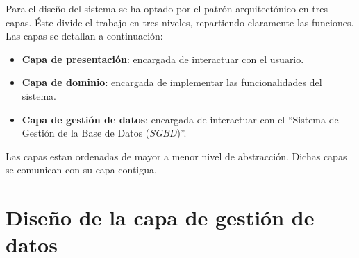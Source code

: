 

Para el diseño del sistema se ha optado por el patrón arquitectónico en tres capas. Éste divide el trabajo en tres niveles, repartiendo claramente las funciones.\\
Las capas se detallan a continuación:
\begin{itemize}
\item \textbf{Capa de presentación}: encargada de interactuar con el usuario.
\item \textbf{Capa de dominio}: encargada de implementar las funcionalidades del sistema.
\item \textbf{Capa de gestión de datos}: encargada de interactuar con el ``Sistema de Gestión de la Base de Datos (\textit{SGBD})''.
\end{itemize}
Las capas estan ordenadas de mayor a menor nivel de abstracción. Dichas capas se comunican con su capa contigua.\\

\section{Diseño de la capa de gestión de datos}
